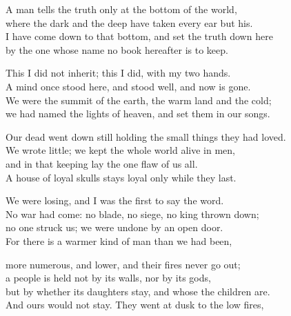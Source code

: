 
\begingroup
\newcommand{\ravarscarline}[1]{%
  {\color{ink!62}\leavevmode\hbox to\linewidth{\scriptsize #1\hfil}}\\}
\newcommand{\ravarscarstanza}[4]{%
  \ravarscarline{#1}%
  \ravarscarline{#2}%
  \ravarscarline{#3}%
  \ravarscarline{#4}%
  \medskip}

\begin{founder}
A man tells the truth only at the bottom of the world,\\
where the dark and the deep have taken every ear but his.\\
I have come down to that bottom, and set the truth down here\\
by the one whose name no book hereafter is to keep.\\
\medskip

This I did not inherit; this I did, with my two hands.\\
A mind once stood here, and stood well, and now is gone.\\
We were the summit of the earth, the warm land and the cold;\\
we had named the lights of heaven, and set them in our songs.\\
\medskip

Our dead went down still holding the small things they had loved.\\
We wrote little; we kept the whole world alive in men,\\
and in that keeping lay the one flaw of us all.\\
A house of loyal skulls stays loyal only while they last.\\
\medskip

We were losing, and I was the first to say the word.\\
No war had come: no blade, no siege, no king thrown down;\\
no one struck us; we were undone by an open door.\\
For there is a warmer kind of man than we had been,\\
\medskip

more numerous, and lower, and their fires never go out;\\
a people is held not by its walls, nor by its gods,\\
but by whether its daughters stay, and whose the children are.\\
And ours would not stay. They went at dusk to the low fires,\\
\medskip


\end{founder}
